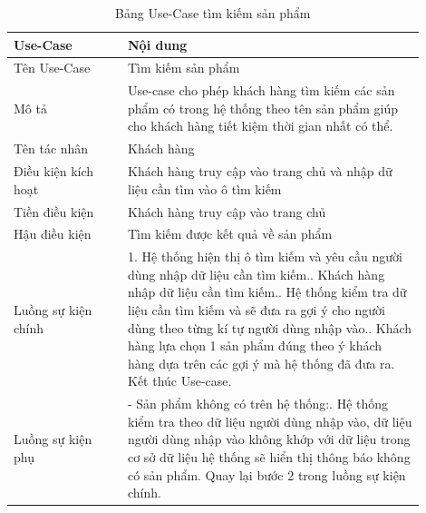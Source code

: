 \begin{longtable}[htp]{ |m{0.25\linewidth}|m{0.65\linewidth}|}
 \caption{Bảng Use-Case tìm kiếm sản phẩm \label{long}}\\
 \hline
 Use-Case & Nội dung \\
 \hline
 Tên Use-Case & Tìm kiếm sản phẩm \\
 \hline
 Mô tả & Use-case cho phép khách hàng tìm kiếm các sản phẩm có trong hệ thống theo tên sản phẩm giúp cho khách hàng tiết kiệm thời gian nhất có thể.\\
 \hline
 Tên tác nhân & Khách hàng\\
 \hline
 Điều kiện kích hoạt & Khách hàng truy cập vào trang chủ và nhập dữ liệu cần tìm vào ô tìm kiếm\\
 \hline
 Tiền điều kiện & Khách hàng truy cập vào trang chủ\\
 \hline
 Hậu điều kiện & Tìm kiếm được kết quả về sản phẩm\\
 \hline
 Luồng sự kiện chính & 
  1. Hệ thống hiện thị ô tìm kiếm và yêu cầu người dùng nhập dữ liệu cần tìm kiếm.\newline
  2. Khách hàng nhập dữ liệu cần tìm kiếm.\newline
  3. Hệ thống kiểm tra dữ liệu cần tìm kiếm và sẽ đưa ra gợi ý cho người dùng theo từng kí tự người dùng nhập vào.\newline
  4. Khách hàng lựa chọn 1 sản phẩm đúng theo ý khách hàng dựa trên các gợi ý mà hệ thống đã đưa ra\newline
  5. Kết thúc Use-case.	
 \\
 \hline
 Luồng sự kiện phụ & 
 - Sản phẩm không có trên hệ thống:\newline
 1. Hệ thống kiểm tra theo dữ liệu người dùng nhập vào, dữ liệu người dùng nhập vào không khớp với dữ liệu trong cơ sở dữ liệu hệ thống sẽ hiển thị thông báo không có sản phẩm.\newline
  Quay lại bước 2 trong luồng sự kiện chính.
 \\
 \hline
\end{longtable}


